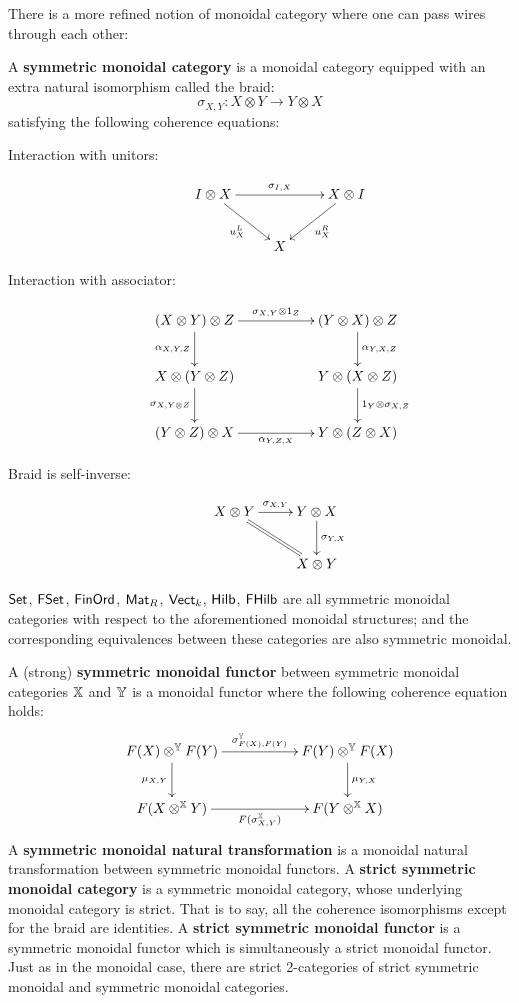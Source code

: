 There is a more refined notion of monoidal category where one can pass wires through each other:
\begin{definition}
A {\bf symmetric monoidal category} is a monoidal category equipped with an extra natural isomorphism called the braid:
$$
\sigma_{X,Y}:X\otimes Y \to Y\otimes X
$$
satisfying the following coherence equations:
\begin{description}
\item[Interaction with unitors:]
$$
\xymatrix{
I \otimes X \ar[rr]^{\sigma_{I,X}} \ar[rd]_{u^L_X} && X \otimes I \ar[ld]^{u^R_X} \\
& X &
}
$$
\item[Interaction with associator:]
$$
\xymatrix{
  (X\otimes Y)\otimes Z \ar[rr]^{\sigma_{X,Y}\otimes 1_Z} \ar[d]_{\alpha_{X,Y,Z}}
    &
    &  (Y\otimes X)\otimes Z \ar[d]^{\alpha_{Y,X,Z}}
  \\X\otimes(Y\otimes Z) \ar[d]_{\sigma_{X,Y\otimes Z}}
    &
    &  Y\otimes(X\otimes Z) \ar[d]^{1_Y\otimes \sigma_{X,Z}}
  \\ (Y\otimes Z)\otimes X \ar[rr]_{\alpha_{Y,Z,X}}
    &
    & Y\otimes (Z\otimes X)
}
$$
\item[Braid is self-inverse:]
$$
\xymatrix{
   X\otimes Y \ar[r]^{\sigma_{X,Y}} \ar@{=}[dr]
   &  Y\otimes X \ar[d]^{\sigma_{Y,X}}\\
   & X \otimes Y
}
$$
\end{description}
\end{definition}
\begin{example}
$\mathsf{Set}$, $\mathsf{FSet}$, $\mathsf{FinOrd}$, $\mathsf{Mat}_R$, $\mathsf{Vect}_k$, $\mathsf{Hilb}$, $\mathsf{FHilb}$ are all symmetric monoidal categories with respect to the aforementioned monoidal structures; and the corresponding equivalences between these categories are also symmetric monoidal.
\end{example}
\begin{definition}
A (strong) {\bf symmetric monoidal functor} between symmetric monoidal categories $\mathbb{X}$ and $\mathbb{Y}$ is a monoidal functor where the following coherence equation holds:
$$
\xymatrix{
  F(X)\otimes^\Y F(Y) \ar[rr]^{\sigma_{F(X),F(Y)}^\Y} \ar[d]_{\mu_{X,Y}}
   && F(Y) \otimes^\Y F(X) \ar[d]^{\mu_{Y,X}}
\\F(X\otimes^\X Y) \ar[rr]_{F(\sigma_{X,Y}^\X)}
 && F(Y \otimes^\X X)
}
$$
A {\bf symmetric monoidal natural transformation} is a monoidal natural transformation between symmetric monoidal functors.  
A {\bf strict symmetric monoidal category} is a symmetric monoidal category, whose underlying monoidal category is strict. That is to say, all the coherence isomorphisms except for the braid are identities.
A {\bf strict symmetric monoidal functor} is a symmetric monoidal functor which is simultaneously a strict monoidal functor.
Just as in the monoidal case, there are strict 2-categories of strict symmetric monoidal and symmetric monoidal categories.
\end{definition}

